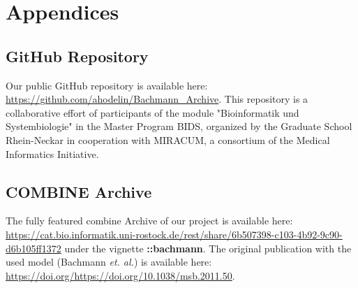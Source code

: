 \section*{Appendices}

\subsection*{GitHub Repository} \label{git}

Our public GitHub repository is available here: \url{https://github.com/ahodelin/Bachmann_Archive}.
This repository is a collaborative effort of participants of the module "Bioinformatik und Systembiologie" in the Master Program BIDS, organized by the Graduate School Rhein-Neckar in cooperation with MIRACUM, a consortium of the Medical Informatics Initiative.

\subsection*{COMBINE Archive}

The fully featured \ac{combine} Archive of our project is available here: \url{https://cat.bio.informatik.uni-rostock.de/rest/share/6b507398-c103-4b92-9c90-d6b105ff1372} under the vignette  \textbf{::bachmann}. The original publication with the used model (Bachmann \textit{et. al.}) is available here: \url{https://doi.org/https://doi.org/10.1038/msb.2011.50}.